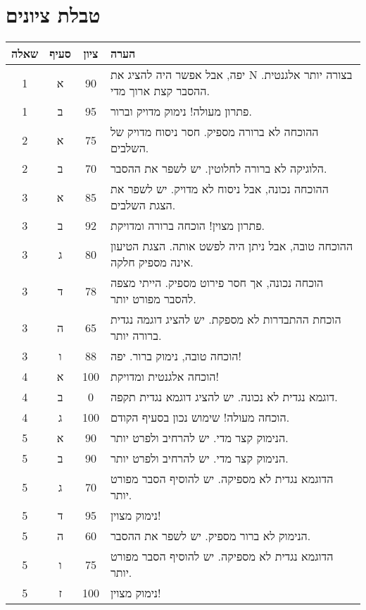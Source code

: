 \documentclass{article}
\begin{document}
\section*{טבלת ציונים}
\begin{RTL}
\begin{tabular}{|c|c|c|p{10cm}|}
\hline
שאלה & סעיף & ציון & הערה \\
\hline
1 & א & 90 & יפה, אבל אפשר היה להציג את N בצורה יותר אלגנטית.  ההסבר קצת ארוך מדי. \\ \hline
1 & ב & 95 & פתרון מעולה! נימוק מדויק וברור. \\ \hline
2 & א & 75 & ההוכחה לא ברורה מספיק.  חסר ניסוח מדויק של השלבים. \\ \hline
2 & ב & 70 & הלוגיקה לא ברורה לחלוטין.  יש לשפר את ההסבר. \\ \hline
3 & א & 85 & ההוכחה נכונה, אבל ניסוח לא מדויק.  יש לשפר את הצגת השלבים. \\ \hline
3 & ב & 92 & פתרון מצוין! הוכחה ברורה ומדויקת. \\ \hline
3 & ג & 80 & ההוכחה טובה, אבל ניתן היה לפשט אותה.  הצגת הטיעון אינה מספיק חלקה. \\ \hline
3 & ד & 78 & הוכחה נכונה, אך חסר פירוט מספיק.  הייתי מצפה להסבר מפורט יותר. \\ \hline
3 & ה & 65 & הוכחת ההתבדרות לא מספקת.  יש להציג דוגמה נגדית ברורה יותר. \\ \hline
3 & ו & 88 & הוכחה טובה, נימוק ברור.  יפה! \\ \hline
4 & א & 100 & הוכחה אלגנטית ומדויקת! \\ \hline
4 & ב & 0 & דוגמא נגדית לא נכונה.  יש להציג דוגמא נגדית תקפה. \\ \hline
4 & ג & 100 & הוכחה מעולה!  שימוש נכון בסעיף הקודם. \\ \hline
5 & א & 90 & הנימוק קצר מדי.  יש להרחיב ולפרט יותר. \\ \hline
5 & ב & 90 & הנימוק קצר מדי.  יש להרחיב ולפרט יותר. \\ \hline
5 & ג & 70 & הדוגמא נגדית לא מספיקה.  יש להוסיף הסבר מפורט יותר. \\ \hline
5 & ד & 95 & נימוק מצוין! \\ \hline
5 & ה & 60 & הנימוק לא ברור מספיק.  יש לשפר את ההסבר. \\ \hline
5 & ו & 75 & הדוגמא נגדית לא מספיקה.  יש להוסיף הסבר מפורט יותר. \\ \hline
5 & ז & 100 & נימוק מצוין! \\ \hline
\end{tabular}
\end{RTL}
\end{document}

